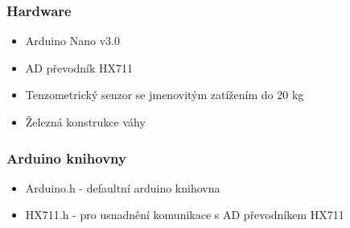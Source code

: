 \subsubsection{Hardware}
\begin{itemize}
    \item Arduino Nano v3.0
    \item AD převodník HX711
    \item Tenzometrický senzor se jmenovitým zatížením do 20 kg
    \item Železná konstrukce váhy
\end{itemize}

\subsubsection{Arduino knihovny}
\begin{itemize}
    \item Arduino.h - defaultní arduino knihovna
    \item HX711.h - pro usnadnění komunikace s AD převodníkem HX711
\end{itemize}




